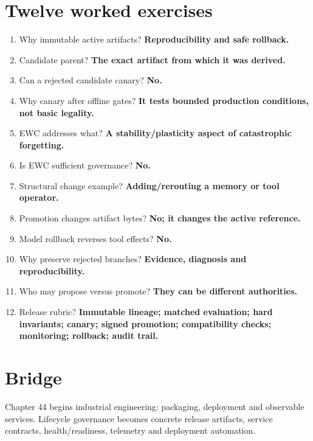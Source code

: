 \section{Twelve worked exercises}
\begin{enumerate}
\item Why immutable active artifacts? \textbf{Reproducibility and safe rollback.}
\item Candidate parent? \textbf{The exact artifact from which it was derived.}
\item Can a rejected candidate canary? \textbf{No.}
\item Why canary after offline gates? \textbf{It tests bounded production conditions, not basic legality.}
\item EWC addresses what? \textbf{A stability/plasticity aspect of catastrophic forgetting.}
\item Is EWC sufficient governance? \textbf{No.}
\item Structural change example? \textbf{Adding/rerouting a memory or tool operator.}
\item Promotion changes artifact bytes? \textbf{No; it changes the active reference.}
\item Model rollback reverses tool effects? \textbf{No.}
\item Why preserve rejected branches? \textbf{Evidence, diagnosis and reproducibility.}
\item Who may propose versus promote? \textbf{They can be different authorities.}
\item Release rubric? \textbf{Immutable lineage; matched evaluation; hard invariants; canary; signed promotion; compatibility checks; monitoring; rollback; audit trail.}
\end{enumerate}

\section{Bridge}
Chapter 44 begins industrial engineering: packaging, deployment and observable services. Lifecycle governance becomes concrete release artifacts, service contracts, health/readiness, telemetry and deployment automation.
